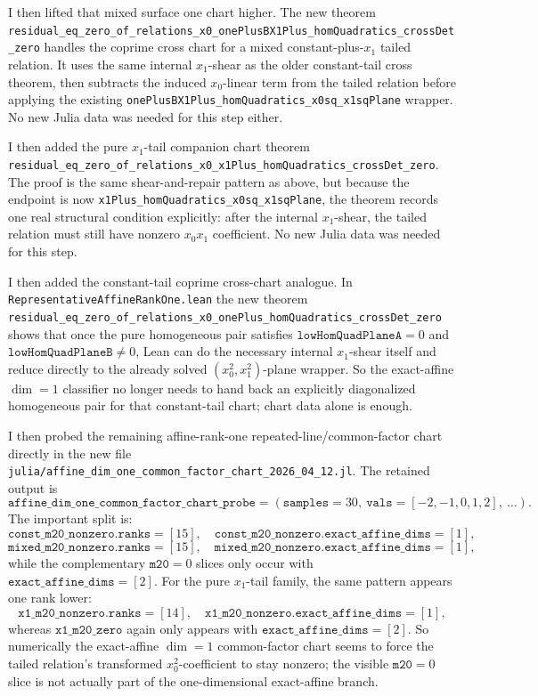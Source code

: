 \documentclass[11pt]{article}
\begin{document}
I then lifted that mixed surface one chart higher. The new theorem
\texttt{residual\_eq\_zero\_of\_relations\_x0\_onePlusBX1Plus\_homQuadratics\_crossDet\_zero}
handles the coprime cross chart for a mixed constant-plus-\(x_1\) tailed
relation. It uses the same internal \(x_1\)-shear as the older constant-tail
cross theorem, then subtracts the induced \(x_0\)-linear term from the tailed
relation before applying the existing
\texttt{onePlusBX1Plus\_homQuadratics\_x0sq\_x1sqPlane} wrapper. No new Julia
data was needed for this step either.

I then added the pure \(x_1\)-tail companion chart theorem
\texttt{residual\_eq\_zero\_of\_relations\_x0\_x1Plus\_homQuadratics\_crossDet\_zero}.
The proof is the same shear-and-repair pattern as above, but because the
endpoint is now \texttt{x1Plus\_homQuadratics\_x0sq\_x1sqPlane}, the theorem
records one real structural condition explicitly: after the internal
\(x_1\)-shear, the tailed relation must still have nonzero \(x_0x_1\)
coefficient. No new Julia data was needed for this step.

I then added the constant-tail coprime cross-chart analogue. In
\texttt{RepresentativeAffineRankOne.lean} the new theorem
\texttt{residual\_eq\_zero\_of\_relations\_x0\_onePlus\_homQuadratics\_crossDet\_zero}
shows that once the pure homogeneous pair satisfies
\(\texttt{lowHomQuadPlaneA}=0\) and \(\texttt{lowHomQuadPlaneB}\neq 0\), Lean
can do the necessary internal \(x_1\)-shear itself and reduce directly to the
already solved \((x_0^2,x_1^2)\)-plane wrapper. So the exact-affine
\(\dim=1\) classifier no longer needs to hand back an explicitly diagonalized
homogeneous pair for that constant-tail chart; chart data alone is enough.

I then probed the remaining affine-rank-one repeated-line/common-factor chart
directly in the new file
\texttt{julia/affine\_dim\_one\_common\_factor\_chart\_2026\_04\_12.jl}. The
retained output is
\[
  \texttt{affine\_dim\_one\_common\_factor\_chart\_probe} =
  (\texttt{samples}=30,\ \texttt{vals}=[-2,-1,0,1,2],\ \dots).
\]
The important split is:
\[
  \texttt{const\_m20\_nonzero.ranks}=[15],\quad
  \texttt{const\_m20\_nonzero.exact\_affine\_dims}=[1],
\]
\[
  \texttt{mixed\_m20\_nonzero.ranks}=[15],\quad
  \texttt{mixed\_m20\_nonzero.exact\_affine\_dims}=[1],
\]
while the complementary \(\texttt{m20}=0\) slices only occur with
\(\texttt{exact\_affine\_dims}=[2]\). For the pure \(x_1\)-tail family, the
same pattern appears one rank lower:
\[
  \texttt{x1\_m20\_nonzero.ranks}=[14],\quad
  \texttt{x1\_m20\_nonzero.exact\_affine\_dims}=[1],
\]
whereas \(\texttt{x1\_m20\_zero}\) again only appears with
\(\texttt{exact\_affine\_dims}=[2]\). So numerically the exact-affine
\(\dim=1\) common-factor chart seems to force the tailed relation's transformed
\(x_0^2\)-coefficient to stay nonzero; the visible \(\texttt{m20}=0\) slice is
not actually part of the one-dimensional exact-affine branch.
\end{document}
